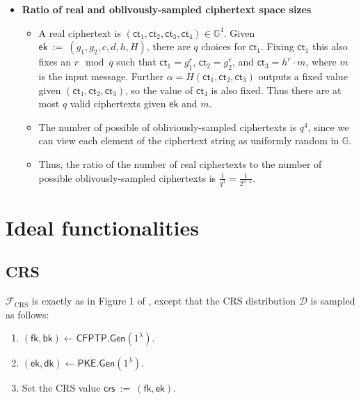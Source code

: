 \documentclass[11pt,letterpaper]{article}
\newcommand{\doclearpage}{%
  \iffull\clearpage\else\fi
}
\theoremstyle{plain} %
\theoremstyle{definition} %
\theoremstyle{remark} %
\newcommand{\eqdef}{\ {:=} \ }
\newcommand{\SecParam}{\lambda}
\newcommand{\PKE}{\mathsf{PKE}}
\newcommand{\Gen}{\mathsf{Gen}}
\newcommand{\EncKey}{\mathsf{ek}}
\newcommand{\DecKey}{\mathsf{dk}}
\newcommand{\Msg}{m}
\newcommand{\Ct}{\mathsf{ct}}
\newcommand{\Rand}{r}
\newcommand{\CFPTP}{\mathsf{CFPTP}}
\newcommand{\ForwKey}{\mathsf{fk}}
\newcommand{\BackKey}{\mathsf{bk}}
\newcommand{\IF}{\mathcal{F}} %
\newcommand{\IFCrs}{\IF_{\mathrm{CRS}}}
\newcommand{\CrsDistr}{\mathcal{D}}
\newcommand{\crs}{\mathsf{crs}}
\newcommand{\Group}{\mathbb{G}}
\newcommand{\GrpOrd}{q}
\newcommand{\GrpEltC}{c}
\newcommand{\GrpEltD}{d}
\newcommand{\GrpEltH}{h}
\newcommand{\Generator}{g}
\newcommand{\Hash}{H}
\newcommand{\Tag}{\alpha}
\begin{document}
\begin{itemize}
\item \textbf{Ratio of real and oblivously-sampled ciphertext space sizes}
\begin{itemize}[nolistsep]
    \item A real ciphertext is $(\Ct_1,\Ct_2,\Ct_3,\Ct_4) \in \Group^4$. Given $\EncKey \eqdef (\Generator_1, \Generator_2, \GrpEltC, \GrpEltD, \GrpEltH, \Hash)$, there are $q$ choices for $\Ct_1$. Fixing $\Ct_1$ this also fixes an $\Rand \mod \GrpOrd$ such that $\Ct_1 = \Generator_1^r$, $\Ct_2 = \Generator_2^r$, and $\Ct_3 = \GrpEltH^r\cdot \Msg$, where $\Msg$ is the input message. Further $\Tag = \Hash(\Ct_1, \Ct_2, \Ct_3)$ outputs a fixed value given $(\Ct_1, \Ct_2, \Ct_3)$, so the value of $\Ct_4$ is also fixed. Thus there are at most $\GrpOrd$ valid ciphertexts given $\EncKey$ and $\Msg$.

    \item The number of possible of obliviously-sampled ciphertexts is $\GrpOrd^4$, since we can view each element of the ciphertext string as uniformly random in $\Group$.

    \item Thus, the ratio of the number of real ciphertexts to the number of possible oblivously-sampled ciphertexts is $\frac{1}{\GrpOrd^3} = \frac{1}{2^{3\cdot\SecParam}}$.
\end{itemize}

\end{itemize}

\doclearpage
\section{Ideal functionalities}
\label{sec:ideal-functionalities}

\subsection{CRS}
\label{sec:ideal-func-crs}
$\IFCrs$ is exactly as in Figure 1 of \cite{CanettiF01}, except that the CRS distribution $\CrsDistr$ is sampled as follows:
\begin{enumerate}[nolistsep]
	\item $(\ForwKey,\BackKey) \gets \CFPTP.\Gen(1^{\SecParam})$.
	\item $(\EncKey,\DecKey) \gets \PKE.\Gen(1^{\SecParam})$.
	\item Set the CRS value $\crs \eqdef (\ForwKey, \EncKey)$.
\end{enumerate}
\end{document}
